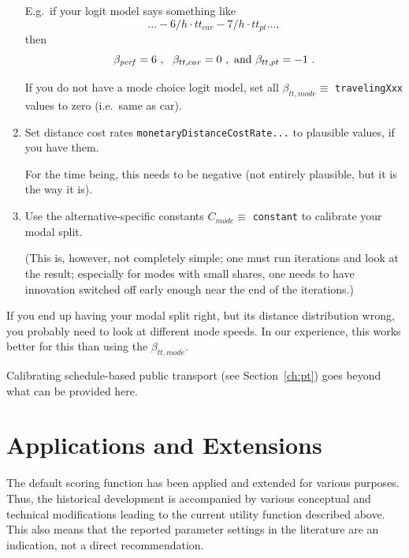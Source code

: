 \begin{enumerate}
E.g.\ if your logit model says something like 
\[
... -6/h \cdot tt_{car} - 7/h \cdot tt_{pt} ... ,
\]
then 
\[
\beta_{\it perf} = 6 \ , \ \ \beta_{tt,car} = 0 \ , \hbox{ and } \beta_{tt,pt} = -1 \ .
\]

If you do not have a mode choice logit model, set all $\beta_{tt,mode} \equiv$ \verb$travelingXxx$ values to zero (i.e.\ same as car).

\item Set distance cost rates \verb$monetaryDistanceCostRate...$ to plausible values, if you have them.

For the time being, this needs to be negative (not entirely plausible, but it is the way it is).

\item Use the alternative-specific constants $C_{mode} \equiv$ \verb$constant$ to calibrate your modal split.

(This is, however, not completely simple; one must run iterations and look at the result; especially for modes with small shares, one needs to have innovation switched off early enough near the end of the iterations.)

\end{enumerate}

If you end up having your modal split right, but its distance distribution wrong, you probably need to look at different mode speeds.  In our experience, this works better for this than using the $\beta_{tt,mode}$.

Calibrating schedule-based public transport (see Section~\ref{ch:pt}) goes beyond what can be provided here.

\section{Applications and Extensions}
\label{sec:appsExtensions}

The default scoring function has been applied and extended for various purposes. 
Thus, the historical development is accompanied by various conceptual and technical modifications leading to the current utility function described above. This also means that the reported parameter settings in the literature are an indication, not a direct recommendation.

